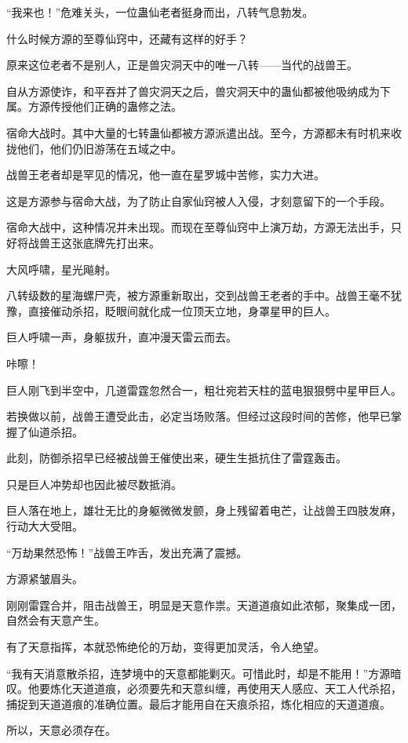 \begin{this_body}
“我来也！”危难关头，一位蛊仙老者挺身而出，八转气息勃发。

什么时候方源的至尊仙窍中，还藏有这样的好手？

原来这位老者不是别人，正是兽灾洞天中的唯一八转——当代的战兽王。

自从方源使诈，和平吞并了兽灾洞天之后，兽灾洞天中的蛊仙都被他吸纳成为下属。方源传授他们正确的蛊修之法。

宿命大战时。其中大量的七转蛊仙都被方源派遣出战。至今，方源都未有时机来收拢他们，他们仍旧游荡在五域之中。

战兽王老者却是罕见的情况，他一直在星罗城中苦修，实力大进。

这是方源参与宿命大战，为了防止自家仙窍被人入侵，才刻意留下的一个手段。

宿命大战中，这种情况并未出现。而现在至尊仙窍中上演万劫，方源无法出手，只好将战兽王这张底牌先打出来。

大风呼啸，星光飚射。

八转级数的星海螺尸壳，被方源重新取出，交到战兽王老者的手中。战兽王毫不犹豫，直接催动杀招，眨眼间就化成一位顶天立地，身罩星甲的巨人。

巨人呼啸一声，身躯拔升，直冲漫天雷云而去。

咔嚓！

巨人刚飞到半空中，几道雷霆忽然合一，粗壮宛若天柱的蓝电狠狠劈中星甲巨人。

若换做以前，战兽王遭受此击，必定当场败落。但经过这段时间的苦修，他早已掌握了仙道杀招。

此刻，防御杀招早已经被战兽王催使出来，硬生生抵抗住了雷霆轰击。

只是巨人冲势却也因此被尽数抵消。

巨人落在地上，雄壮无比的身躯微微发颤，身上残留着电芒，让战兽王四肢发麻，行动大大受阻。

“万劫果然恐怖！”战兽王咋舌，发出充满了震撼。

方源紧皱眉头。

刚刚雷霆合并，阻击战兽王，明显是天意作祟。天道道痕如此浓郁，聚集成一团，自然会有天意产生。

有了天意指挥，本就恐怖绝伦的万劫，变得更加灵活，令人绝望。

“我有天消意散杀招，连梦境中的天意都能剿灭。可惜此时，却是不能用！”方源暗叹。他要炼化天道道痕，必须要先和天意纠缠，再使用天人感应、天工人代杀招，捕捉到天道道痕的准确位置。最后才能用自在天痕杀招，炼化相应的天道道痕。

所以，天意必须存在。


\end{this_body}
